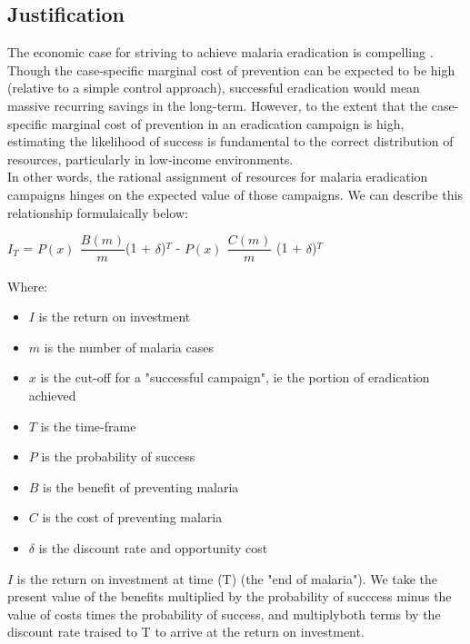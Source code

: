 \documentclass{article}
\begin{document}
\subsection*{Justification}


\noindent The economic case for striving to achieve malaria eradication is compelling \cite{Barofsky2015}. Though the case-specific marginal cost of prevention can be expected to be high (relative to a simple control approach), successful eradication would mean massive recurring savings in the long-term. However, to the extent that the case-specific marginal cost of prevention in an eradication campaign is high, estimating the likelihood of success is fundamental to the correct distribution of resources, particularly in low-income environments. \\

\noindent In other words, the rational assignment of resources for malaria eradication campaigns hinges on the expected value of those campaigns. We can describe this relationship formulaically below: 

\begin{center}
$I_{T}$ = $P(x)_{}$ $\dfrac{B(m_{})}{m_{}}$(1 + $\delta$)$^{T}$ -  $P(x)_{}$ $\dfrac{C(m_{})}{m_{}}$ (1 + $\delta$)$^{T}$
\end{center}

\noindent Where:
\begin{itemize}
\item $ I $ is the return on investment
\item $ m $ is the number of malaria cases
\item $ x $ is the cut-off for a "successful campaign", ie the portion of eradication achieved
\item $ T $ is the time-frame 
\item $ P $ is the probability of success
\item $ B $ is the benefit of preventing malaria
\item $ C $ is the cost of preventing malaria
\item $ \delta $ is the discount rate and opportunity cost
\end{itemize}

\noindent $ I $ is the return on investment at time (T) (the "end of malaria"). We take the present value of the benefits multiplied by the probability of succcess minus the value of costs times the probability of success, and multiplyboth terms by the discount rate traised to T to arrive at the return on investment. 
\end{document}
